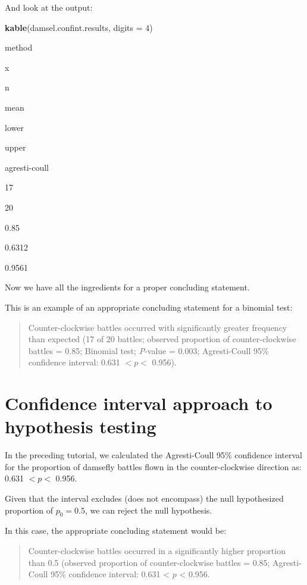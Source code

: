 \documentclass[
]{book}
\newenvironment{Shaded}{\begin{snugshade}}{\end{snugshade}}
\newcommand{\AttributeTok}[1]{\textcolor[rgb]{0.13,0.29,0.53}{#1}}
\newcommand{\DecValTok}[1]{\textcolor[rgb]{0.00,0.00,0.81}{#1}}
\newcommand{\FunctionTok}[1]{\textcolor[rgb]{0.13,0.29,0.53}{\textbf{#1}}}
\newcommand{\NormalTok}[1]{#1}
\begin{document}
And look at the output:

\begin{Shaded}
\begin{Highlighting}[]
\FunctionTok{kable}\NormalTok{(damsel.confint.results, }\AttributeTok{digits =} \DecValTok{4}\NormalTok{)}
\end{Highlighting}
\end{Shaded}

method

x

n

mean

lower

upper

agresti-coull

17

20

0.85

0.6312

0.9561

Now we have all the ingredients for a proper concluding statement.

This is an example of an appropriate concluding statement for a binomial test:

\begin{quote}
Counter-clockwise battles occurred with significantly greater frequency than expected (17 of 20 battles; observed proportion of counter-clockwise battles = 0.85; Binomial test; \emph{P}-value = 0.003; Agresti-Coull 95\% confidence interval: 0.631 \(< {p} <\) 0.956).
\end{quote}

\section{Confidence interval approach to hypothesis testing}\label{prophypconf}

In the preceding tutorial, we calculated the Agresti-Coull 95\% confidence interval for the proportion of damsefly battles flown in the counter-clockwise direction as: 0.631 \(< {p} <\) 0.956.

Given that the interval excludes (does not encompass) the null hypothesized proportion of \(p_0 = 0.5\), we can reject the null hypothesis.

In this case, the appropriate concluding statement would be:

\begin{quote}
Counter-clockwise battles occurred in a significantly higher proportion than 0.5 (observed proportion of counter-clockwise battles = 0.85; Agresti-Coull 95\% confidence interval: 0.631 \textless{} \({p}\) \textless{} 0.956.
\end{quote}
\end{document}
